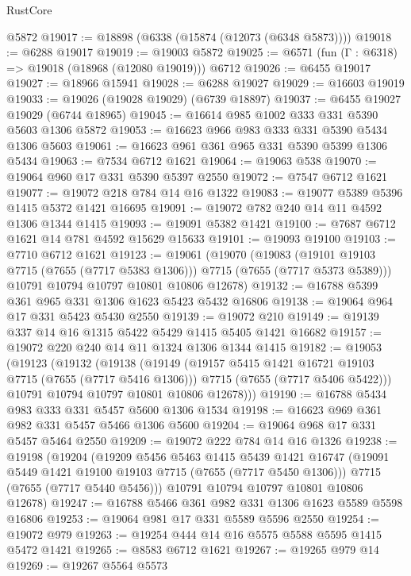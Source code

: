 \begin{lexlean}{RustCore}
\begin{coremodule}
    @5872
@19017 := @18898 (@6338 (@15874 (@12073 (@6348 @5873))))
@19018 := @6288 @19017
@19019 := @19003 @5872
@19025 := @6571 (fun (Γ : @6318) => @19018 (@18968 (@12080 @19019))) @6712
@19026 := @6455 @19017
@19027 := @18966 @15941
@19028 := @6288 @19027
@19029 := @16603 @19019
@19033 := @19026 (@19028 @19029) (@6739 @18897)
@19037 := @6455 @19027 @19029 (@6744 @18965)
@19045 := @16614 @985 @1002 @333 @331 @5390 @5603 @1306 @5872
@19053 := @16623 @966 @983 @333 @331 @5390 @5434 @1306 @5603
@19061 := @16623 @961 @361 @965 @331 @5390 @5399 @1306 @5434
@19063 := @7534 @6712 @1621
@19064 := @19063 @538
@19070 := @19064 @960 @17 @331 @5390 @5397 @2550
@19072 := @7547 @6712 @1621
@19077 := @19072 @218 @784 @14 @16 @1322
@19083 := @19077 @5389 @5396 @1415 @5372 @1421 @16695
@19091 := @19072 @782 @240 @14 @11 @4592 @1306 @1344 @1415
@19093 := @19091 @5382 @1421
@19100 := @7687 @6712 @1621 @14 @781 @4592 @15629 @15633
@19101 := @19093 @19100
@19103 := @7710 @6712 @1621
@19123 := @19061
    (@19070
      (@19083 (@19101 @19103 @7715 (@7655 (@7717 @5383 @1306))) @7715 (@7655 (@7717 @5373 @5389)))
      @10791
      @10794
      @10797
      @10801
      @10806
      @12678)
@19132 := @16788 @5399 @361 @965 @331 @1306 @1623 @5423 @5432 @16806
@19138 := @19064 @964 @17 @331 @5423 @5430 @2550
@19139 := @19072 @210
@19149 := @19139 @337 @14 @16 @1315 @5422 @5429 @1415 @5405 @1421 @16682
@19157 := @19072 @220 @240 @14 @11 @1324 @1306 @1344 @1415
@19182 := @19053
    (@19123
      (@19132
        (@19138
          (@19149
            (@19157 @5415 @1421 @16721 @19103 @7715 (@7655 (@7717 @5416 @1306)))
            @7715
            (@7655 (@7717 @5406 @5422)))
          @10791
          @10794
          @10797
          @10801
          @10806
          @12678)))
@19190 := @16788 @5434 @983 @333 @331 @5457 @5600 @1306 @1534
@19198 := @16623 @969 @361 @982 @331 @5457 @5466 @1306 @5600
@19204 := @19064 @968 @17 @331 @5457 @5464 @2550
@19209 := @19072 @222 @784 @14 @16 @1326
@19238 := @19198
    (@19204
      (@19209
        @5456
        @5463
        @1415
        @5439
        @1421
        @16747
        (@19091 @5449 @1421 @19100 @19103 @7715 (@7655 (@7717 @5450 @1306)))
        @7715
        (@7655 (@7717 @5440 @5456)))
      @10791
      @10794
      @10797
      @10801
      @10806
      @12678)
@19247 := @16788 @5466 @361 @982 @331 @1306 @1623 @5589 @5598 @16806
@19253 := @19064 @981 @17 @331 @5589 @5596 @2550
@19254 := @19072 @979
@19263 := @19254 @444 @14 @16 @5575 @5588 @5595 @1415 @5472 @1421
@19265 := @8583 @6712 @1621
@19267 := @19265 @979 @14
@19269 := @19267 @5564 @5573

\end{coremodule}
\end{lexlean}
